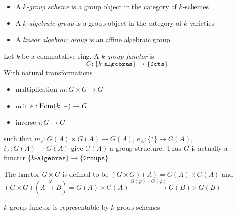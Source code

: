 \documentclass[main]{subfiles}
\begin{document}
\begin{definition}\hfill
\begin{itemize}
\item A \textit{$k$-group scheme} is a group object in the category of $k$-schemes
\item A \textit{$k$-algebraic group} is a group object in the category of $k$-varieties
\item A \textit{linear algebraic group} is an affine algebraic group
\end{itemize}
\end{definition}

\begin{definition}
Let $k$ be a commutative ring. A $k$-\textit{group functor} is
\[G:\{\texttt{$k$-algebras}\}\to\{\texttt{Sets}\}\]
With natural transformations
\begin{itemize}
\item multiplication $m:G\times G\to G$
\item unit $e:\operatorname{Hom}(k,-)\to G$
\item inverse $i:G\to G$
\end{itemize}
such that $m_A:G(A)\times G(A)\to G(A)$, $e_A:\{*\}\to G(A)$, $i_A:G(A)\to G(A)$ give $G(A)$ a group structure. Thus $G$ is actually a functor $\{\texttt{$k$-algebras}\}\to\{\texttt{Groups}\}$
\end{definition}

\begin{remark}
The functor $G\times G$ is defined to be $(G\times G)(A)=G(A)\times G(A)$ and $(G\times G)(A\xrightarrow{\varphi}B)=G(A)\times G(A)\xrightarrow{G(\varphi)\times G(\varphi)}G(B)\times G(B)$
\end{remark}

\begin{proposition}
$k$-group functor is representable by $k$-group schemes
\end{proposition}
\end{document}
